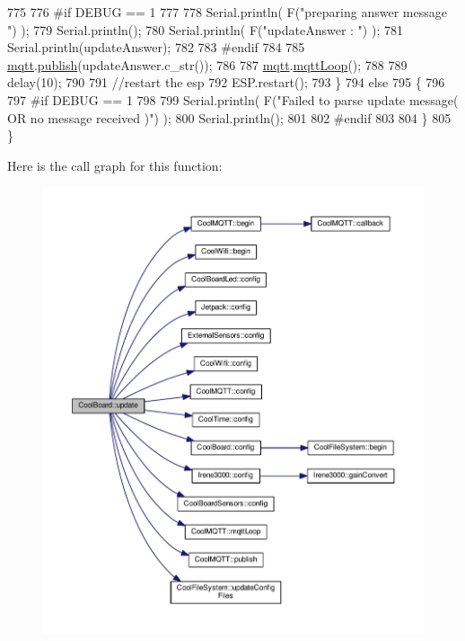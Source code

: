 \begin{DoxyCode}
775 
776 \textcolor{preprocessor}{        #if DEBUG == 1}
777 
778             Serial.println( F(\textcolor{stringliteral}{"preparing answer message "}) );
779             Serial.println();
780             Serial.println( F(\textcolor{stringliteral}{"updateAnswer : "}) );
781             Serial.println(updateAnswer);
782         
783 \textcolor{preprocessor}{        #endif  }
784 
785             \hyperlink{classCoolBoard_a2399f44d7c23c1149a335cb3b46d90f1}{mqtt}.\hyperlink{classCoolMQTT_ace977b3e90ab14b1199fe5c4fb0a13ec}{publish}(updateAnswer.c\_str());
786             
787             \hyperlink{classCoolBoard_a2399f44d7c23c1149a335cb3b46d90f1}{mqtt}.\hyperlink{classCoolMQTT_aa5eaae967b562b62cbcf2b8d81f6e5d5}{mqttLoop}();
788 
789             delay(10);
790             
791             \textcolor{comment}{//restart the esp}
792             ESP.restart();
793     \}
794     \textcolor{keywordflow}{else}
795     \{
796     
797 \textcolor{preprocessor}{    #if DEBUG == 1}
798 
799         Serial.println( F(\textcolor{stringliteral}{"Failed to parse update message( OR no message received )"}) );
800         Serial.println();
801     
802 \textcolor{preprocessor}{    #endif}
803     
804     \}       
805 \}
\end{DoxyCode}
Here is the call graph for this function\+:\nopagebreak
\begin{figure}[H]
\begin{center}
\leavevmode
\includegraphics[width=350pt]{classCoolBoard_a8612756d3f73198cdde857a66f0fe690_cgraph}
\end{center}
\end{figure}
